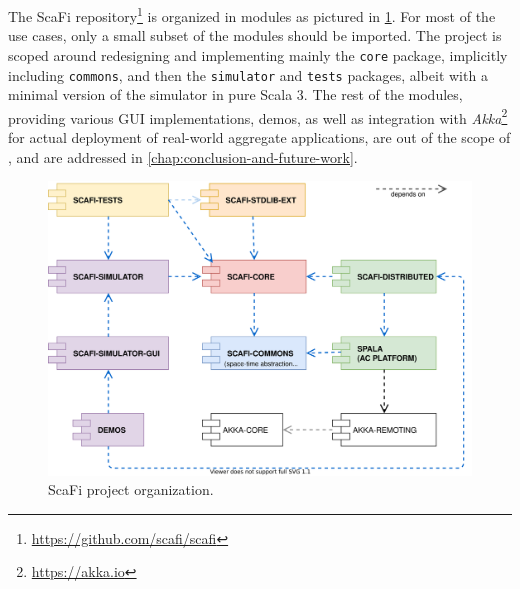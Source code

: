 The ScaFi repository\footnote{\url{https://github.com/scafi/scafi}} is organized in modules as pictured in \cref{fig:scafi-project-org}.
%
For most of the use cases, only a small subset of the modules should be imported.
%
The \this project is scoped around redesigning and implementing mainly the \texttt{core} package, implicitly including \texttt{commons}, and then the \texttt{simulator} and \texttt{tests} packages, albeit with a minimal version of the simulator in pure Scala 3.
%
The rest of the modules, providing various \ac{GUI} implementations, demos, as well as integration with \textit{Akka}\footnote{\url{https://akka.io}} for actual deployment of real-world aggregate applications, are out of the scope of \this, and are addressed in \cref{chap:conclusion-and-future-work}.

\begin{figure}
    \centering
    \includegraphics[width=.8\linewidth]{figures/scafi-project-org.drawio.png}
    \caption{ScaFi project organization.}
    \label{fig:scafi-project-org}
\end{figure}

